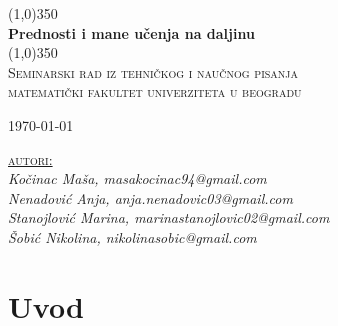 \documentclass{article}
\date{\displaydate{date}}
\begin{document}
\begin{titlepage}
    \begin{center}
        \line(1,0){350}\\
        [0.25in] %
        \huge{\bfseries Prednosti i mane učenja na daljinu}\\
        [2mm]
        \line(1,0){350}\\
        [1.5cm]
        \textsc{\LARGE Seminarski rad iz tehničkog i naučnog pisanja}
        \textsc{\\ \Large matematički fakultet univerziteta u beogradu}\\
        [8cm]
        
    \end{center}
    

    \makeatletter
    \raggedleft\Large{\today}
    \makeatother
    
    \begin{flushright}
        \textsc{\large{\underline {autori:}}\\}
        \textit{
        \large Kočinac Maša, masakocinac94@gmail.com\\
        \large Nenadović Anja, anja.nenadovic03@gmail.com\\
        \large Stanojlović Marina, marinastanojlovic02@gmail.com\\
        \large Šobić Nikolina, nikolinasobic@gmail.com\\
        }
    \end{flushright}
    
\end{titlepage}






\tableofcontents
\cleardoublepage



\section {Uvod}
\end{document}
